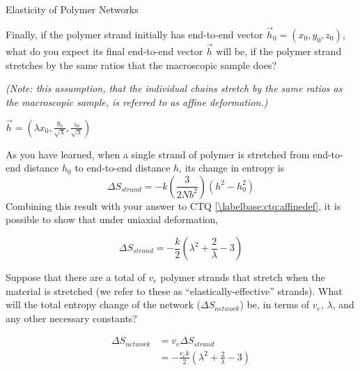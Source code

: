 \begin{activity}{Elasticity of Polymer Networks}
\begin{ctqs}
\begin{enumerate}
			\end{enumerate}
	
	\question Finally, if the polymer strand initially has end-to-end vector $\vec h_0 = (x_0, y_0, z_0)$, what do you expect its final end-to-end vector $\vec h$ will be, if the polymer strand stretches by the same ratios that the macroscopic sample does?  \label{\labelbase:ctq:affinedef}
			
			\emph{(Note: this assumption, that the individual chains stretch by the same ratios as the macroscopic sample, is referred to as \emph{affine deformation}.)}
		
			\begin{solution}[0.75in]
				$\vec h = (\lambda x_0, \frac{y_0}{\sqrt{\lambda}}, \frac{z_0}{\sqrt{\lambda}})$
			\end{solution}
				
\end{ctqs}

\begin{infobox}

	As you have learned, when a single strand of polymer is stretched from end-to-end distance $h_0$ to end-to-end distance $h$, its change in entropy is 
			\begin{equation*}
				\Delta S_{strand} = -k\left(\frac{3}{2Nb^2}\right)(h^2 - h_0^2)
			\end{equation*}
	Combining this result with your answer to CTQ \ref{\labelbase:ctq:affinedef}, it is possible to show that under uniaxial deformation,
	
		\begin{equation*}	
				\Delta S_{strand} = -\frac{k}{2}\left(\lambda^2 + \frac{2}{\lambda} - 3\right)
			\label{\labelbase:eqn:delSstranduniaxial}
		\end{equation*}
			
\end{infobox}

\begin{ctqs}
		
	\question Suppose that there are a total of $v_e$ polymer strands that stretch when the material is stretched (we refer to these as ``elastically-effective'' strands). What will the total entropy change of the network ($\Delta S_{network}$) be, in terms of $v_e$, $\lambda$, and any other necessary constants?
		
			\begin{solution}[1.25in]
				\begin{align*}
					\Delta S_{network} &= v_e \Delta S_{strand}\\
						&= -\frac{v_e k}{2}\left(\lambda^2 + \frac{2}{\lambda} - 3\right)
				\end{align*}
			\end{solution}
		

\end{ctqs}
\end{activity}
